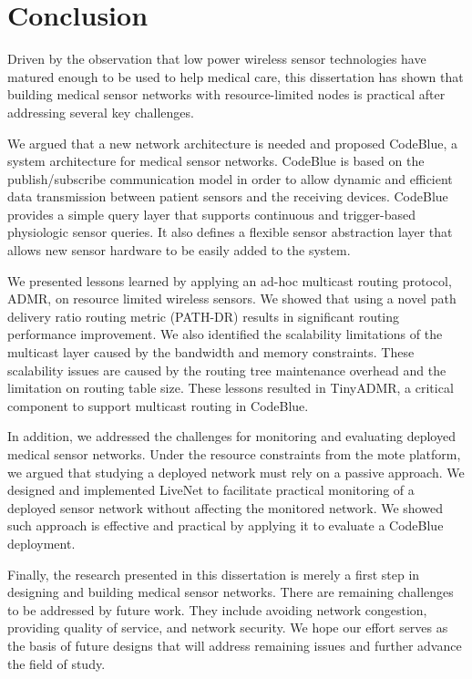 \chapter{Conclusion}
\label{sec-cb-conclusions}
\label{sec-cb-conclusion}

Driven by the observation that low power wireless sensor technologies have
matured enough to be used to help medical care, this dissertation has shown
that building medical sensor networks with resource-limited nodes is
practical after addressing several key challenges.

We argued that a new network architecture is needed and proposed CodeBlue, a
system architecture for medical sensor networks. CodeBlue is based on the
publish/subscribe communication model in order to allow dynamic and efficient
data transmission between patient sensors and the receiving devices. CodeBlue
provides a simple query layer that supports continuous and trigger-based 
physiologic sensor queries. It also defines a flexible sensor abstraction
layer that allows new sensor hardware to be easily added to the system.

We presented lessons learned by applying an ad-hoc multicast routing protocol,
ADMR, on resource limited wireless sensors. We showed that using a novel path
delivery ratio routing metric (PATH-DR) results in significant routing
performance improvement. We also identified the scalability limitations of the
multicast layer caused by the bandwidth and memory constraints. These
scalability issues are caused by the routing tree maintenance overhead and
the limitation on routing table size. These lessons resulted in TinyADMR, a
critical component to support multicast routing in CodeBlue. 

In addition, we addressed the challenges for monitoring and evaluating 
deployed medical sensor networks. Under the resource constraints from the mote
platform, we argued that studying a deployed network must rely on a passive
approach. We designed and implemented LiveNet to facilitate practical
monitoring of a deployed sensor network without affecting the monitored
network. We showed such approach is effective and practical by applying it to
evaluate a CodeBlue deployment.

Finally, the research presented in this dissertation is merely a
first step in designing and building medical sensor networks. There are
remaining challenges to be addressed by future work. They include
avoiding network congestion, providing quality of service, and network
security. We hope our effort serves as the basis of future designs that will
address remaining issues and further advance the field of study. 
